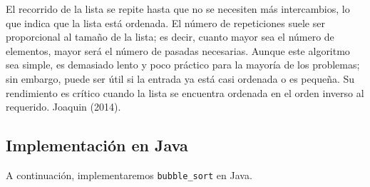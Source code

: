 \documentclass[
  spanish,
  letterpaper,
  DIV=11,
  numbers=noendperiod]{scrreprt}
\begin{document}
El recorrido de la lista se repite hasta que no se necesiten más
intercambios, lo que indica que la lista está ordenada. El número de
repeticiones suele ser proporcional al tamaño de la lista; es decir,
cuanto mayor sea el número de elementos, mayor será el número de pasadas
necesarias. Aunque este algoritmo sea simple, es demasiado lento y poco
práctico para la mayoría de los problemas; sin embargo, puede ser útil
si la entrada ya está casi ordenada o es pequeña. Su rendimiento es
crítico cuando la lista se encuentra ordenada en el orden inverso al
requerido. Joaquin (2014).

\subsection{Implementación en Java}\label{implementaciuxf3n-en-java}

A continuación, implementaremos \texttt{bubble\_sort} en Java.
\end{document}
